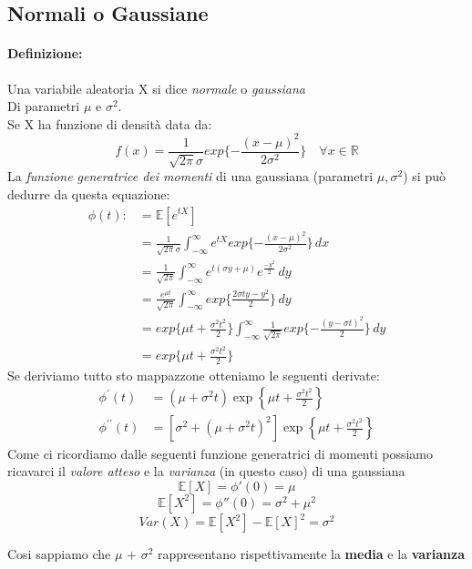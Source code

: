 \documentclass[]{article}
\newcommand{\ev}{\mathbb{E}[X]}
\renewcommand{\ev}[1]{\mathbb{E}[#1]}
\newcommand{\definizione}{\paragraph{Definizione:}}
\begin{document}
    \subsection{Normali o Gaussiane}
    \definizione Una variabile aleatoria X si dice \textit{normale} o \textit{gaussiana} \\ 
    Di parametri $\mu$ e $\sigma^2$. \\
    Se X ha funzione di densità data da:
    \[ f(x) = \frac{1}{\sqrt{2 \pi} \sigma} exp\{- \frac{(x - \mu)^2}{2 \sigma^2}\} \quad \forall x \in \mathbb{R} \]
    La \textit{funzione generatrice dei momenti} di una gaussiana (parametri $\mu, \sigma^2$) si può dedurre da questa equazione:
    \begin{equation*}
        \begin{split}
            \phi(t) :&= \ev{e^{tX}} \\
            & = \frac{1}{\sqrt{2\pi} \sigma} \int_{-\infty}^{\infty} e^{tX} exp\{ - \frac{(x - \mu)^2}{2 \sigma^2}\} \, dx \\
            & = \frac{1}{\sqrt{2\pi}} \int_{-\infty}^{\infty} e^{t(\sigma y + \mu)} e^{\frac{-y^2}{2}} \, dy \\
            & = \frac{e^{\mu t}}{\sqrt{2 \pi}} \int_{-\infty}^{\infty} exp \{ \frac{2 \sigma ty - y^2}{2}\} \, dy \\
            & = exp\{ \mu t + \frac{\sigma^2 t^2}{2}\} \int_{-\infty}^{\infty} \frac{1}{\sqrt{2 \pi}} exp \{ - \frac{(y - \sigma t)^2}{2}\} \, dy \\
            & = exp \{ \mu t + \frac{\sigma^2 t^2}{2}\}
        \end{split}
    \end{equation*}
    Se deriviamo tutto sto mappazzone otteniamo le seguenti derivate:
    \begin{equation}
        \begin{aligned}
        \phi^{\prime}(t) & =\left(\mu+\sigma^2 t\right) \exp \left\{\mu t+\frac{\sigma^2 t^2}{2}\right\} \\
        \phi^{\prime \prime}(t) & =\left[\sigma^2+\left(\mu+\sigma^2 t\right)^2\right] \exp \left\{\mu t+\frac{\sigma^2 t^2}{2}\right\}
        \end{aligned}
    \end{equation}
    Come ci ricordiamo dalle seguenti funzione generatrici di momenti possiamo ricavarci il \textit{valore atteso} e la \textit{varianza} (in questo caso) di una gaussiana 
    \[ \ev{X} = \phi'(0) = \mu \]
    \[ \ev{X^2} = \phi''(0) = \sigma^2 + \mu^2 \]
    \[ Var(X) = \ev{X^2} - \ev{X}^2 = \sigma^2 \]
    \centerline{Cosi sappiamo che $\mu$ + $\sigma^2$ rappresentano rispettivamente la \textbf{media} e la \textbf{varianza}}
\end{document}
